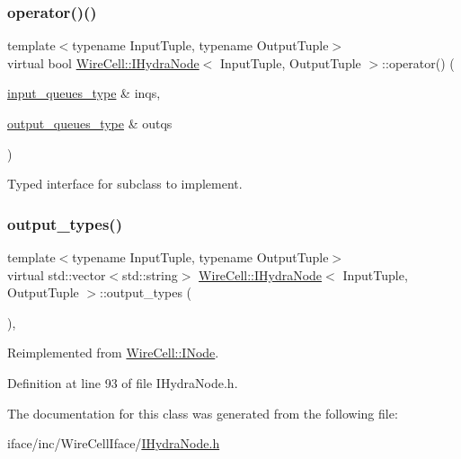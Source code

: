 \subsubsection{\texorpdfstring{operator()()}{operator()()}\hspace{0.1cm}{\footnotesize\ttfamily [2/2]}}
{\footnotesize\ttfamily template$<$typename Input\+Tuple, typename Output\+Tuple$>$ \\
virtual bool \hyperlink{class_wire_cell_1_1_i_hydra_node}{Wire\+Cell\+::\+I\+Hydra\+Node}$<$ Input\+Tuple, Output\+Tuple $>$\+::operator() (\begin{DoxyParamCaption}\item[{\hyperlink{class_wire_cell_1_1_i_hydra_node_ada2ba4a3ba2716c9838ae039e475d683}{input\+\_\+queues\+\_\+type} \&}]{inqs,  }\item[{\hyperlink{class_wire_cell_1_1_i_hydra_node_aeb800228236a385497609533fc0fe256}{output\+\_\+queues\+\_\+type} \&}]{outqs }\end{DoxyParamCaption})\hspace{0.3cm}{\ttfamily [pure virtual]}}



Typed interface for subclass to implement. 

\mbox{\label{class_wire_cell_1_1_i_hydra_node_af668f59ced5931ba78e63df17b25670d}} 
\subsubsection{\texorpdfstring{output\+\_\+types()}{output\_types()}}
{\footnotesize\ttfamily template$<$typename Input\+Tuple, typename Output\+Tuple$>$ \\
virtual std\+::vector$<$std\+::string$>$ \hyperlink{class_wire_cell_1_1_i_hydra_node}{Wire\+Cell\+::\+I\+Hydra\+Node}$<$ Input\+Tuple, Output\+Tuple $>$\+::output\+\_\+types (\begin{DoxyParamCaption}{ }\end{DoxyParamCaption})\hspace{0.3cm}{\ttfamily [inline]}, {\ttfamily [virtual]}}



Reimplemented from \hyperlink{class_wire_cell_1_1_i_node_aba7e537684cb4f2453796ff73da2d602}{Wire\+Cell\+::\+I\+Node}.



Definition at line 93 of file I\+Hydra\+Node.\+h.



The documentation for this class was generated from the following file\+:\begin{DoxyCompactItemize}
\item 
iface/inc/\+Wire\+Cell\+Iface/\hyperlink{_i_hydra_node_8h}{I\+Hydra\+Node.\+h}\end{DoxyCompactItemize}
